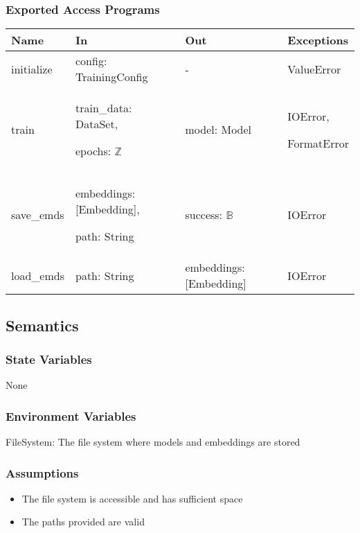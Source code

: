 \documentclass[12pt, titlepage]{article}
\begin{document}
\subsubsection{Exported Access Programs}

\begin{center}
\begin{tabular}{p{2cm} p{4cm} p{4cm} p{2cm}}
\hline
\textbf{Name} & \textbf{In} & \textbf{Out} & \textbf{Exceptions} \\
\hline
initialize & config: TrainingConfig & - & ValueError \\
\hline
train & train\_data: DataSet,

epochs: $\mathbb{Z}$

& model: Model & IOError,

FormatError \\
\hline
save\_emds & embeddings: [Embedding],

path: String & success: $\mathbb{B}$ & IOError \\
\hline
load\_emds & path: String & embeddings: [Embedding] & IOError \\
\hline
\end{tabular}
\end{center}

\subsection{Semantics}

\subsubsection{State Variables}
None

\subsubsection{Environment Variables}

FileSystem: The file system where models and embeddings are stored

\subsubsection{Assumptions}

\begin{itemize}
  \item The file system is accessible and has sufficient space
  \item The paths provided are valid
\end{itemize}
\end{document}

